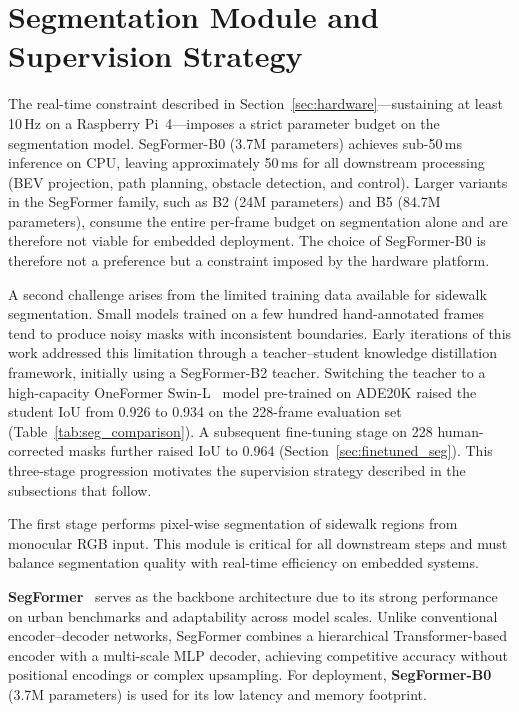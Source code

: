 \documentclass[12pt,letterpaper,oneside]{report}
\begin{document}
\section{Segmentation Module and Supervision Strategy}
\label{sec:segmentation}

The real-time constraint described in Section~\ref{sec:hardware}---sustaining at least 10\,Hz on a Raspberry Pi~4---imposes a strict parameter budget on the segmentation model. SegFormer-B0 (3.7M parameters) achieves sub-50\,ms inference on CPU, leaving approximately 50\,ms for all downstream processing (BEV projection, path planning, obstacle detection, and control). Larger variants in the SegFormer family, such as B2 (24M parameters) and B5 (84.7M parameters), consume the entire per-frame budget on segmentation alone and are therefore not viable for embedded deployment. The choice of SegFormer-B0 is therefore not a preference but a constraint imposed by the hardware platform.

A second challenge arises from the limited training data available for sidewalk segmentation. Small models trained on a few hundred hand-annotated frames tend to produce noisy masks with inconsistent boundaries. Early iterations of this work addressed this limitation through a teacher--student knowledge distillation framework, initially using a SegFormer-B2 teacher. Switching the teacher to a high-capacity OneFormer Swin-L~\cite{oneformer} model pre-trained on ADE20K raised the student IoU from 0.926 to 0.934 on the 228-frame evaluation set (Table~\ref{tab:seg_comparison}).  A subsequent fine-tuning stage on 228 human-corrected masks further raised IoU to 0.964 (Section~\ref{sec:finetuned_seg}). This three-stage progression motivates the supervision strategy described in the subsections that follow.

The first stage performs pixel-wise segmentation of sidewalk regions from monocular RGB input. This module is critical for all downstream steps and must balance segmentation quality with real-time efficiency on embedded systems.

\textbf{SegFormer}~\cite{segformer} serves as the backbone architecture due to its strong performance on urban benchmarks and adaptability across model scales. Unlike conventional encoder--decoder networks, SegFormer combines a hierarchical Transformer-based encoder with a multi-scale MLP decoder, achieving competitive accuracy without positional encodings or complex upsampling. For deployment, \textbf{SegFormer-B0} (3.7M parameters) is used for its low latency and memory footprint.
\end{document}
